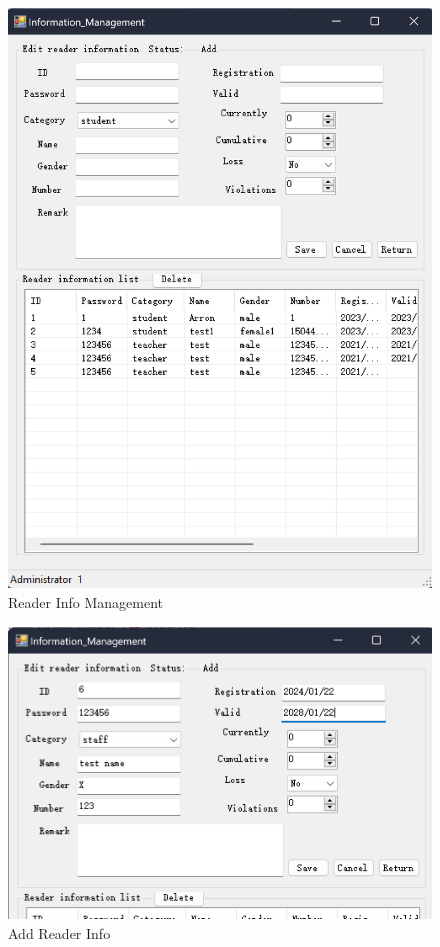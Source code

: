 \documentclass{article}
\begin{document}
\begin{figure}[H]
    \centering
    \includegraphics[width=1\textwidth]{../pic/reader_info_mag.png}
    \caption{Reader Info Management}
    \label{fig:reader_info_mag}
\end{figure}

\begin{figure}[H]
    \centering
    \includegraphics[width=1\textwidth]{../pic/add.png}
    \caption{Add Reader Info}
    \label{fig:add}
\end{figure}
\end{document}
